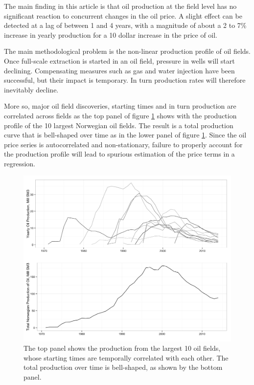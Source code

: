 \documentclass[12pt]{article}
\begin{document}
The main finding in this article is that oil production at the field level has no significant reaction to concurrent changes in the oil price.  A slight effect can be detected at a lag of between 1 and 4 years, with a magnitude of about a 2 to 7\% increase in yearly production for a 10 dollar increase in the price of oil.  


The main methodological problem is the non-linear production profile of oil fields.  Once full-scale extraction is started in an oil field, pressure in wells will start declining. Compensating measures such as gas and water injection have been successful, but their impact is temporary. In turn production rates will therefore inevitably decline.

More so, major oil field discoveries, starting times and in turn production are correlated across fields as the top panel of figure \ref{oil_decline} shows with the production profile of the 10 largest Norwegian oil fields.  The result is a total production curve that is bell-shaped over time as in the lower panel of figure \ref{oil_decline}.  Since the oil price series is autocorrelated and non-stationary, failure to properly account for the production profile will lead to spurious estimation of the price terms in a regression.

\begin{figure}
	\includegraphics[width=1\textwidth]{figures/oil_decline.png}
	\caption{The top panel shows the production from the largest 10 oil fields, whose starting times are temporally correlated with each other.  The total production over time is bell-shaped, as shown by the bottom panel.}
	\label{oil_decline}
\end{figure}
\end{document}

